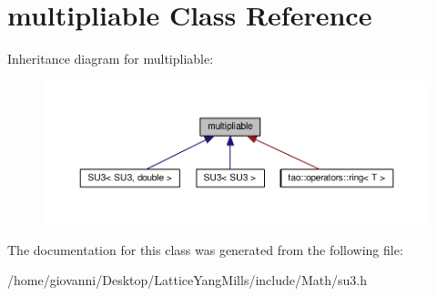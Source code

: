 \hypertarget{classtao_1_1operators_1_1multipliable}{}\section{multipliable Class Reference}
\label{classtao_1_1operators_1_1multipliable}


Inheritance diagram for multipliable\+:\nopagebreak
\begin{figure}[H]
\begin{center}
\leavevmode
\includegraphics[width=350pt]{classtao_1_1operators_1_1multipliable__inherit__graph}
\end{center}
\end{figure}


The documentation for this class was generated from the following file\+:\begin{DoxyCompactItemize}
\item 
/home/giovanni/\+Desktop/\+Lattice\+Yang\+Mills/include/\+Math/su3.\+h\end{DoxyCompactItemize}
